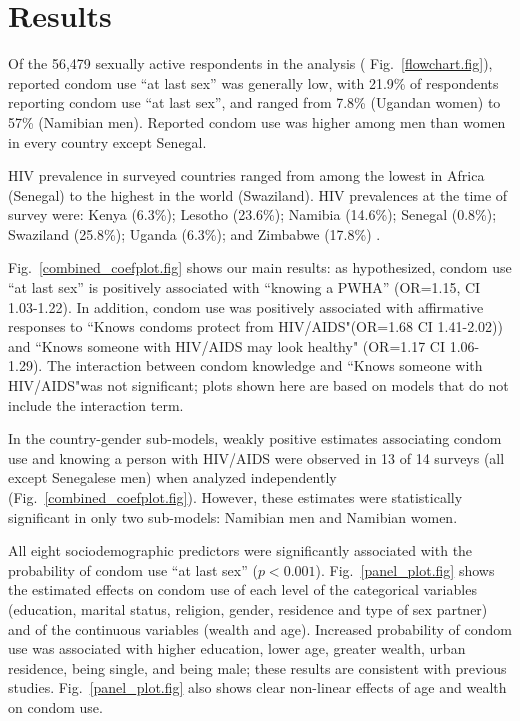 \documentclass[10pt,letterpaper]{article}
\newcommand{\fref}[1]{Fig.~\ref{#1.fig}}
\newcommand{\KnowsPWHA}{``Knows someone with HIV/AIDS"}
\newcommand{\KnowsCP}{``Knows condoms protect from HIV/AIDS"}
\begin{document}
\section{Results}

Of the 56,479 sexually active respondents in the analysis ( \fref{flowchart}), reported condom use ``at last sex'' was generally low, with 21.9\% of respondents reporting condom use ``at last sex'', and ranged from 7.8\% (Ugandan women) to 57\% (Namibian men). Reported condom use was higher among men than women in every country except Senegal. 

HIV prevalence in surveyed countries ranged from among the lowest in  Africa (Senegal) to the highest in the world (Swaziland). HIV prevalences at the time of survey were: Kenya (6.3\%); Lesotho (23.6\%); Namibia (14.6\%); Senegal (0.8\%); Swaziland (25.8\%); Uganda (6.3\%); and Zimbabwe (17.8\%) \cite{UNAIDS10}.

\fref{combined_coefplot} shows our main results: as hypothesized, condom use ``at last sex'' is positively associated with ``knowing a PWHA'' (OR=1.15, CI 1.03-1.22). In addition, condom use was positively associated with affirmative responses to \KnowsCP (OR=1.68 CI 1.41-2.02)) and ``Knows someone with HIV/AIDS may look healthy"  (OR=1.17 CI 1.06-1.29). The interaction between condom knowledge and \KnowsPWHA was not significant; plots shown here are based on models that do not include the interaction term.

In the country-gender sub-models, weakly positive estimates associating condom use and knowing a person with HIV/AIDS were observed in 13 of 14 surveys (all except Senegalese men) when analyzed independently (\fref{combined_coefplot}). However, these estimates were statistically significant in only two sub-models: Namibian men and Namibian women.  

All eight sociodemographic predictors were significantly associated with the probability of condom use ``at last sex'' ($p<0.001$). \fref{panel_plot} shows the estimated effects on condom use of each level of the categorical variables (education, marital status, religion, gender, residence and type of sex partner) and of the continuous variables (wealth and age). Increased probability of condom use was associated with higher education, lower age, greater wealth, urban residence, being single, and being male; these results are consistent with previous studies.
\fref{panel_plot} also shows clear non-linear effects of age and wealth on condom use.
\end{document}
